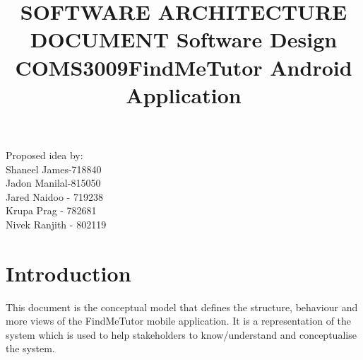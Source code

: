 \documentclass[12pt]{article}
\begin{document}
\title{\textbf{SOFTWARE ARCHITECTURE DOCUMENT }}
\maketitle

\begin{center}
\title{\textbf{Software Design COMS3009}}
\maketitle 
\end{center}
\begin{center}
\title{\textbf{FindMeTutor Android Application}}
\maketitle 
\end{center}

\begin{center}
Proposed idea by:\\
Shaneel James-718840
\\Jadon Manilal-815050
\\Jared Naidoo - 719238
\\Krupa Prag - 782681
\\Nivek Ranjith - 802119
\end{center}


\newpage
\tableofcontents
\newpage


\section{\textbf{Introduction}}
This document is the conceptual model that defines the structure, behaviour and more views of the FindMeTutor mobile application. It is a representation of the system which is used to help stakeholders to know/understand and conceptualise the system.

\end{document}
